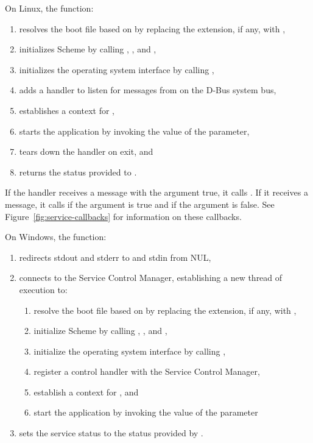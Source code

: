 On Linux, the  function:
\begin{enumerate} %
\item resolves the boot file based on
   by replacing the extension, if any, with
  ,
\item initializes Scheme by calling ,
  , and ,
\item initializes the operating system interface by calling ,
\item adds a handler to listen for messages from
   on the D-Bus system bus,
\item establishes a context for ,
\item starts the application by invoking the value of the  parameter,
\item tears down the handler on exit, and
\item returns the status provided to .
\end{enumerate}

If the handler receives a  message with the argument
true, it calls .
If it receives a  message, it calls
 if the argument is true
and  if the argument is false.
See Figure~\ref{fig:service-callbacks} for information on these callbacks.

On Windows, the  function:
\begin{enumerate}
\item redirects stdout and stderr to  and stdin from NUL,
\item connects to the Service Control Manager, establishing a
  new thread of execution to:
  \begin{enumerate} %
    \item resolve the boot file based on  by
      replacing the extension, if any, with ,
    \item initialize Scheme by calling ,
      , and ,
    \item initialize the operating system interface by calling ,
    \item register a control handler with the Service Control Manager,
    \item establish a context for , and
    \item start the application by invoking the value of the
       parameter
  \end{enumerate}
\item sets the service status to the status provided by .
\end{enumerate}

